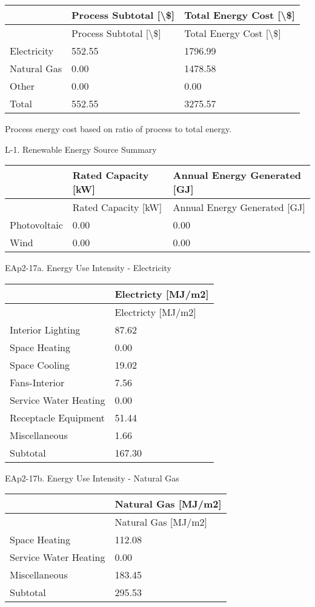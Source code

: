 \begin{longtable}[c]{>{\raggedright}p{1.5in}>{\raggedright}p{2.21in}>{\raggedright}p{2.28in}}
\toprule 
 & Process Subtotal [\textbackslash\$] & Total Energy Cost [\textbackslash\$] \tabularnewline
\midrule
\endfirsthead

\toprule 
 & Process Subtotal [\textbackslash\$] & Total Energy Cost [\textbackslash\$] \tabularnewline
\midrule
\endhead

Electricity & 552.55 & 1796.99 \tabularnewline
Natural Gas & 0.00 & 1478.58 \tabularnewline
Other & 0.00 & 0.00 \tabularnewline
Total & 552.55 & 3275.57 \tabularnewline
\bottomrule
\end{longtable}

Process energy cost based on ratio of process to total energy.

L-1. Renewable Energy Source Summary

\begin{longtable}[c]{@{}lll@{}}
\toprule 
 & Rated Capacity [kW] & Annual Energy Generated [GJ] \tabularnewline
\midrule
\endfirsthead

\toprule 
 & Rated Capacity [kW] & Annual Energy Generated [GJ] \tabularnewline
\midrule
\endhead

Photovoltaic & 0.00 & 0.00 \tabularnewline
Wind & 0.00 & 0.00 \tabularnewline
\bottomrule
\end{longtable}

EAp2-17a. Energy Use Intensity - Electricity

\begin{longtable}[c]{@{}ll@{}}
\toprule 
 & Electricty [MJ/m2] \tabularnewline
\midrule
\endfirsthead

\toprule 
 & Electricty [MJ/m2] \tabularnewline
\midrule
\endhead

Interior Lighting & 87.62 \tabularnewline
Space Heating & 0.00 \tabularnewline
Space Cooling & 19.02 \tabularnewline
Fans-Interior & 7.56 \tabularnewline
Service Water Heating & 0.00 \tabularnewline
Receptacle Equipment & 51.44 \tabularnewline
Miscellaneous & 1.66 \tabularnewline
Subtotal & 167.30 \tabularnewline
\bottomrule
\end{longtable}

EAp2-17b. Energy Use Intensity - Natural Gas

\begin{longtable}[c]{@{}ll@{}}
\toprule 
 & Natural Gas [MJ/m2] \tabularnewline
\midrule
\endfirsthead

\toprule 
 & Natural Gas [MJ/m2] \tabularnewline
\midrule
\endhead

Space Heating & 112.08 \tabularnewline
Service Water Heating & 0.00 \tabularnewline
Miscellaneous & 183.45 \tabularnewline
Subtotal & 295.53 \tabularnewline
\bottomrule
\end{longtable}

